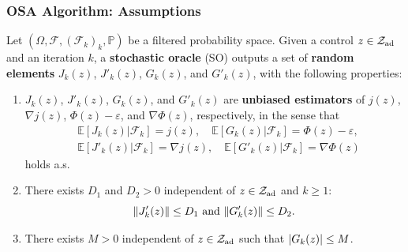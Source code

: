 \documentclass[aspectratio=169,xcolor=dvipsnames,11pt]{beamer}
\renewcommand{\Pr}{\mathbb{P}}
\DeclarePairedDelimiter{\abs}{\lvert}{\rvert}
\DeclarePairedDelimiter{\norm}{\lVert}{\rVert}
\newcommand{\eps}{\varepsilon}
\newcommand{\setZ}{\mathcal{Z}}
\newcommand{\feas}{\setZ_{\rm ad}}
\newcommand{\Ex}{\mathbb E}
\newcommand{\scrF}{\mathcal{F}}
\begin{document}
\begin{footnotesize}
\begin{frame}\frametitle{OSA Algorithm: Assumptions}
\begin{definition}\label{def:so}
Let $(\Omega,\scrF,(\scrF_{k})_{k},\Pr)$ be a filtered probability space. \pause Given
a control $z\in\feas$ and an iteration $k$, a \textbf{stochastic oracle} (SO) outputs a set of \textbf{random elements}
$J_{k}(z)$, $J'_{k}(z)$, $G_{k}(z)$, and $G'_{k}(z)$, with the following properties:\pause
\begin{enumerate}
\item $J_{k}(z)$, $J'_{k}(z)$, $G_{k}(z)$, and $G'_{k}(z)$ are \textbf{unbiased estimators}
of $j(z)$, $\nabla j(z)$, $\Phi(z)-\eps$, and $\nabla \Phi(z)$, respectively, \pause
in the sense that
\begin{equation}\label{eq:unbiased}
\begin{split}
&\Ex[J_{k}(z)\vert\scrF_{k}]=j(z),\quad \Ex[G_{k}(z)\vert \scrF_{k}]=\Phi(z)-\eps,\\
&\Ex[J'_{k}(z)\vert\scrF_{k}]=\nabla j(z),\quad \Ex[G'_{k}(z)\vert \scrF_{k}]=\nabla \Phi(z)
\end{split}
\end{equation}
holds a.s. \pause%
\item  There exists $D_{1}$ and $D_{2}>0$ independent of $z\in\feas$ and $k\geq 1$:
\begin{equation}\label{eq:gradbound}
\norm{J'_{k}(z)}\leq D_{1}\text{ and } \norm{G'_{k}(z)}\leq D_{2}.
\end{equation} 
\item \pause There exists $M>0$ independent of $z \in \feas$ such that $\abs{G_{k}(z)}\leq M$.
\end{enumerate}
\end{definition}\pause
\end{frame}


\end{footnotesize}
\end{document}
